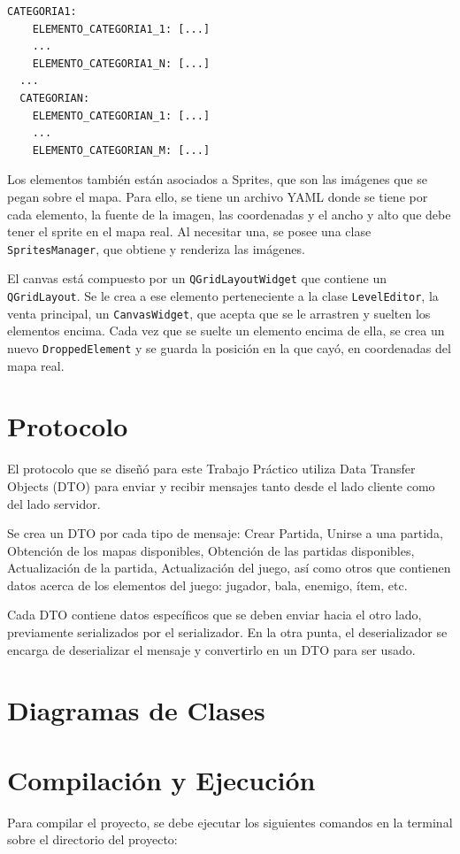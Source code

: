 \documentclass[titlepage,a4paper]{article}
\begin{document}
\begin{lstlisting}[captionpos=b, caption=Ejemplo de formato YAML del mapa]
  CATEGORIA1:
    ELEMENTO_CATEGORIA1_1: [...]
    ...
    ELEMENTO_CATEGORIA1_N: [...]
  ...
  CATEGORIAN:
    ELEMENTO_CATEGORIAN_1: [...]
    ...
    ELEMENTO_CATEGORIAN_M: [...] 
\end{lstlisting}

Los elementos también están asociados a Sprites, que son las imágenes que se pegan sobre el mapa. Para ello, se tiene un archivo YAML donde se tiene por cada elemento, la fuente de la imagen, las coordenadas y el ancho y alto que debe tener el sprite en el mapa real. Al necesitar una, se posee una clase \texttt{SpritesManager}, que obtiene y renderiza las imágenes.

El canvas está compuesto por un \texttt{QGridLayoutWidget} que contiene un \texttt{QGridLayout}. Se le crea a ese elemento perteneciente a la clase \texttt{LevelEditor}, la venta principal, un \texttt{CanvasWidget}, que acepta que se le arrastren y suelten los elementos encima. Cada vez que se suelte un elemento encima de ella, se crea un nuevo \texttt{DroppedElement} y se guarda la posición en la que cayó, en coordenadas del mapa real.

\section{Protocolo}
El protocolo que se diseñó para este Trabajo Práctico utiliza Data Transfer Objects (DTO) para enviar y recibir mensajes tanto desde el lado cliente como del lado servidor.

Se crea un DTO por cada tipo de mensaje: Crear Partida, Unirse a una partida, Obtención de los mapas disponibles, Obtención de las partidas disponibles, Actualización de la partida, Actualización del juego, así como otros que contienen datos acerca de los elementos del juego: jugador, bala, enemigo, ítem, etc.

Cada DTO contiene datos específicos que se deben enviar hacia el otro lado, previamente serializados por el serializador. En la otra punta, el deserializador se encarga de deserializar el mensaje y convertirlo en un DTO para ser usado.

\section{Diagramas de Clases}


\section{Compilación y Ejecución}
Para compilar el proyecto, se debe ejecutar los siguientes comandos en la terminal sobre el directorio del proyecto:
\end{document}
